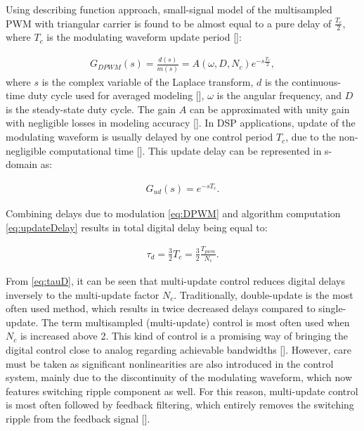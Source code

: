 \documentclass[journal]{IEEEtran}
\begin{document}
Using describing function approach, small-signal model of the multisampled PWM with triangular carrier is found to be almost equal to a pure delay of $\frac{T_c}{2}$, where $T_c$ is the modulating waveform update period []:

\begin{equation}
\begin{aligned}
G_{DPWM} (s) = \frac{d(s)}{m(s)} = A(\omega,D,N_c) e^{-s\frac{T_c}{2}},
\label{eq:DPWM} 
\end{aligned}    
\end{equation}
where $s$ is the complex variable of the Laplace transform, $d$ is the continuous-time duty cycle used for averaged modeling [], $\omega$ is the angular frequency, and $D$ is the steady-state duty cycle. The gain $A$ can be approximated with unity gain with negligible losses in modeling accuracy [].
In DSP applications, update of the modulating waveform is usually delayed by one control period $T_c$, due to the non-negligible computational time []. This update delay can be represented in s-domain as:

\begin{equation}
\begin{aligned}
G_{ud} (s) = e^{-sT_c}.
\label{eq:updateDelay} 
\end{aligned} 
\end{equation}

Combining delays due to modulation \eqref{eq:DPWM} and algorithm computation \eqref{eq:updateDelay} results in total digital delay being equal to:

\begin{equation}
\begin{aligned}
\tau_{d} = \frac{3}{2}T_c = \frac{3}{2} \frac{T_{pwm}}{N_c}.
\label{eq:tauD} 
\end{aligned}    
\end{equation}

From \eqref{eq:tauD}, it can be seen that multi-update control reduces digital delays inversely to the multi-update factor $N_c$. Traditionally, double-update is the most often used method, which results in twice decreased delays compared to single-update.
The term multisampled (multi-update) control is most often used when $N_c$ is increased above 2. This kind of control is a promising way of bringing the digital control close to analog regarding achievable bandwidths []. However, care must be taken as significant nonlinearities are also introduced in the control system, mainly due to the discontinuity of the modulating waveform, which now features switching ripple component as well. For this reason, multi-update control is most often followed by feedback filtering, which entirely removes the switching ripple from the feedback signal []. 
\end{document}

